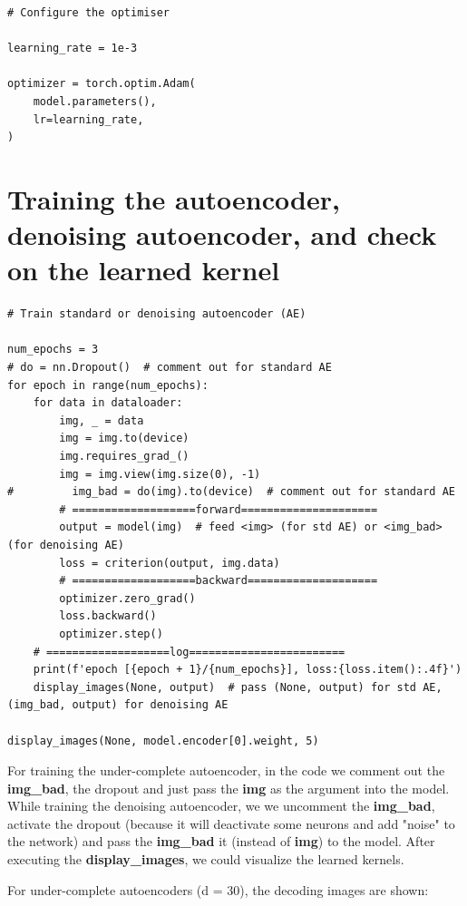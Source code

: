 \begin{verbatim}
# Configure the optimiser

learning_rate = 1e-3

optimizer = torch.optim.Adam(
    model.parameters(),
    lr=learning_rate,
)
\end{verbatim}

\section{Training the autoencoder, denoising autoencoder, and check on the learned kernel}
\begin{verbatim}
# Train standard or denoising autoencoder (AE)

num_epochs = 3
# do = nn.Dropout()  # comment out for standard AE
for epoch in range(num_epochs):
    for data in dataloader:
        img, _ = data
        img = img.to(device)
        img.requires_grad_()
        img = img.view(img.size(0), -1)
#         img_bad = do(img).to(device)  # comment out for standard AE
        # ===================forward=====================
        output = model(img)  # feed <img> (for std AE) or <img_bad> (for denoising AE)
        loss = criterion(output, img.data)
        # ===================backward====================
        optimizer.zero_grad()
        loss.backward()
        optimizer.step()
    # ===================log========================
    print(f'epoch [{epoch + 1}/{num_epochs}], loss:{loss.item():.4f}')
    display_images(None, output)  # pass (None, output) for std AE, (img_bad, output) for denoising AE
    
display_images(None, model.encoder[0].weight, 5)
\end{verbatim}

For training the under-complete autoencoder, in the code we comment out the \textbf{img\_bad}, the dropout and just pass the \textbf{img} as the argument into the model. While training the denoising autoencoder, we we uncomment the \textbf{img\_bad}, activate the dropout (because it will deactivate some neurons and add "noise" to the network) and pass the \textbf{img\_bad} it (instead of \textbf{img}) to the model. After executing the \textbf{display\_images}, we could visualize the learned kernels.

For under-complete autoencoders (d = 30), the decoding images are shown:

